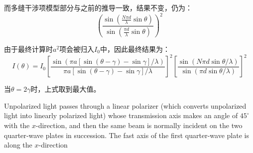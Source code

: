 \begin{solution}
    而多缝干涉项模型部分与之前的推导一致，结果不变，仍为：
    \[\left(\dfrac{\sin(\frac{N\pi d}{\lambda}\sin\theta)}{\sin(\frac{\pi d}{\lambda}\sin\theta)}\right)^2\]

    由于最终计算时$a^2$项会被归入$I_0$中，因此最终结果为：
    \[I(\theta) = I_0 \left[ \frac{\sin( \pi a [\sin(\theta-\gamma) - \sin\gamma]/\lambda)}{\pi a [\sin(\theta-\gamma) - \sin\gamma]/\lambda} \right]^2 \left[ \frac{\sin( N \pi d \sin\theta /\lambda)}{\sin(\pi d \sin\theta /\lambda)} \right]^2\]

    当$\theta = 2\gamma$时，上式取到最大值。
\end{solution}

\begin{solution}[Polarization]
    Unpolarized light passes through a linear polarizer (which converts unpolarized light into linearly polarized light) whose transmission axis makes an angle of $45^\circ$ with the $x$-direction, and then the same beam is normally incident on the two quarter‑wave plates in succession. The fast axis of the first quarter-wave plate is along the $x$-direction


\end{solution}
